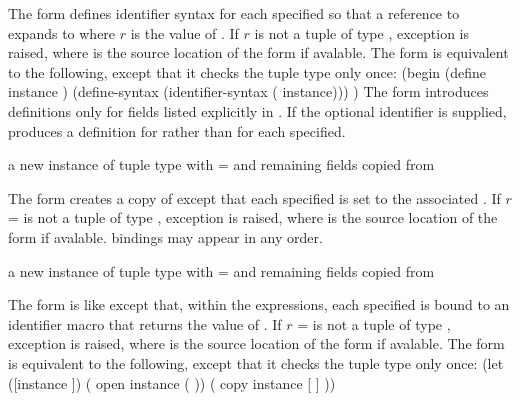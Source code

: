 The  form defines identifier syntax for each specified 
so that a reference to  expands to 
where $r$ is the value of .
If $r$ is not a tuple of type , exception
 is raised, where
 is the source location of the  form if avalable.
The  form is equivalent to the following, except that it
checks the tuple type only once:
\antipar\codebegin
(begin
  (define instance )
  (define-syntax  (identifier-syntax (  instance)))
  \etc{})
\codeend\antipar
The  form introduces definitions only for fields listed explicitly in .
If the optional  identifier is supplied,  produces
a definition for  rather than  for
each  specified.

\begin{syntax}
\end{syntax}
\returns{} a new instance of tuple type  with  =
 \etc{} and remaining fields copied from 

The  form creates a copy of  except that
each specified  is set to the associated . If
$r$ =  is not a tuple of type , exception
 is raised, where
 is the source location of the  form if
avalable.   bindings may appear in any order.

\begin{syntax}
\end{syntax}
\returns{} a new instance of tuple type  with  =
 \etc{} and remaining fields copied from 

The  form is like  except that, within the  expressions,
each specified  is bound to an identifier macro that returns the value of .
If $r$ =  is not a tuple of type , exception
 is raised, where
 is the source location of the  form if avalable.
The  form is equivalent to the following, except that it
checks the tuple type only once:
\antipar\codebegin
(let ([instance ])
  ( open instance ( \etc{}))
  ( copy instance [ ] \etc{}))
\codeend\antipar

